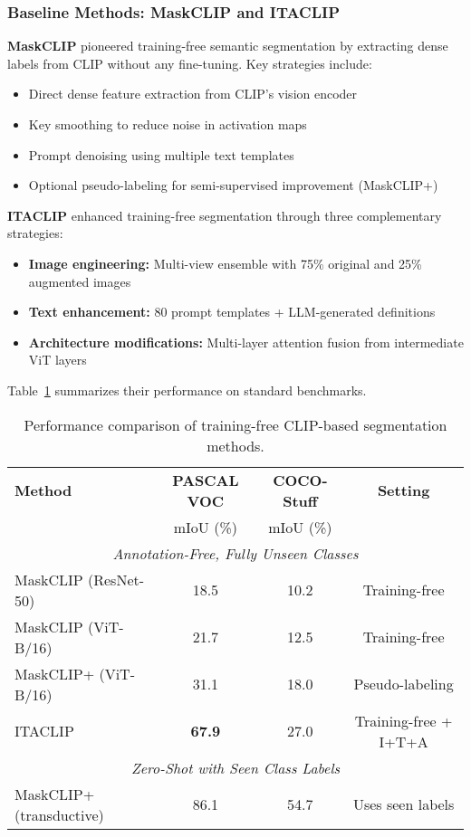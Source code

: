 \subsubsection{Baseline Methods: MaskCLIP and ITACLIP}

\textbf{MaskCLIP} \cite{zhou2022extract} pioneered training-free semantic segmentation by extracting dense labels from CLIP without any fine-tuning. Key strategies include:
\begin{itemize}
    \item Direct dense feature extraction from CLIP's vision encoder
    \item Key smoothing to reduce noise in activation maps
    \item Prompt denoising using multiple text templates
    \item Optional pseudo-labeling for semi-supervised improvement (MaskCLIP+)
\end{itemize}

\textbf{ITACLIP} \cite{shao2024itaclip} enhanced training-free segmentation through three complementary strategies:
\begin{itemize}
    \item \textbf{Image engineering:} Multi-view ensemble with 75\% original and 25\% augmented images
    \item \textbf{Text enhancement:} 80 prompt templates + LLM-generated definitions
    \item \textbf{Architecture modifications:} Multi-layer attention fusion from intermediate ViT layers
\end{itemize}

Table~\ref{tab:baseline_comparison} summarizes their performance on standard benchmarks.

\begin{table}[h]
\centering
\caption{Performance comparison of training-free CLIP-based segmentation methods.}
\label{tab:baseline_comparison}
\begin{tabular}{lccc}
\hline
\textbf{Method} & \textbf{PASCAL VOC} & \textbf{COCO-Stuff} & \textbf{Setting} \\
 & mIoU (\%) & mIoU (\%) & \\
\hline
\multicolumn{4}{c}{\textit{Annotation-Free, Fully Unseen Classes}} \\
\hline
MaskCLIP (ResNet-50) & 18.5 & 10.2 & Training-free \\
MaskCLIP (ViT-B/16) & 21.7 & 12.5 & Training-free \\
MaskCLIP+ (ViT-B/16) & 31.1 & 18.0 & Pseudo-labeling \\
ITACLIP & \textbf{67.9} & 27.0 & Training-free + I+T+A \\
\hline
\multicolumn{4}{c}{\textit{Zero-Shot with Seen Class Labels}} \\
\hline
MaskCLIP+ (transductive) & 86.1 & 54.7 & Uses seen labels \\
\hline
\end{tabular}
\end{table}

